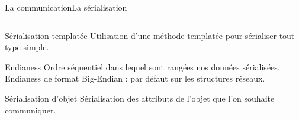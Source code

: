 \documentclass[french]{beamer}
\begin{document}
		\begin{frame}{La communication}{La sérialisation}
	        \begin{columns}
		        \begin{column}{0.65\textwidth}
			    	\begin{block}{Sérialisation templatée}
			            Utilisation d'une méthode templatée pour sérialiser tout type simple.

			        \end{block}
			        
			         \begin{block}{Endianess}
			            Ordre séquentiel dans lequel sont rangées nos données sérialisées.
			            \newline Endianess de format Big-Endian : par défaut sur les structures réseaux.
			        \end{block}

			       	\begin{block}{Sérialisation d'objet}
			            Sérialisation des attributs de l'objet que l'on souhaite communiquer.
			        \end{block}
				\end{column}


\end{columns}
\end{frame}
\end{document}
